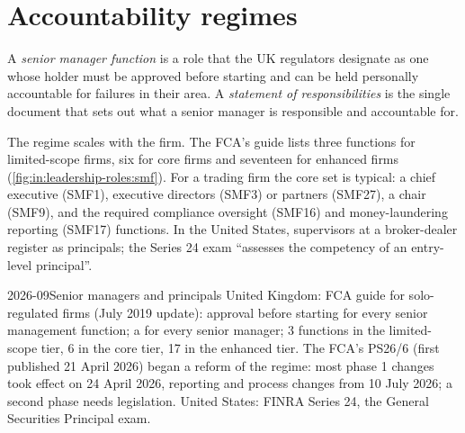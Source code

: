 \section{Accountability regimes}

\begin{definition}\label{def:in:leadership-roles:smf}
A \emph{senior manager function} is a role that the UK regulators designate as one whose
holder must be approved before starting and can be held personally accountable for failures in their area. A
\emph{statement of responsibilities} is the single document that sets out what a
senior manager is responsible and accountable for.
\end{definition}

The regime scales with the firm. The FCA's guide lists three functions for limited-scope firms, six for core firms and
seventeen for enhanced firms (\cref{fig:in:leadership-roles:smf}). For a trading firm the core set is typical: a chief
executive (SMF1), executive directors (SMF3) or partners (SMF27), a chair (SMF9), and the required compliance oversight
(SMF16) and money-laundering reporting (SMF17) functions. In the United States, supervisors at a broker-dealer register as
principals; the Series 24 exam ``assesses the competency of an entry-level principal''.

\begin{dated}{2026-09}{Senior managers and principals}\label{dat:in:leadership-roles:smcr}
United Kingdom: FCA guide for solo-regulated firms (July 2019 update): approval before starting for every senior
management function; a  for every senior manager; 3 functions in the limited-scope tier, 6
in the core tier, 17 in the enhanced tier. The FCA's PS26/6 (first published 21 April 2026) began a reform of the regime:
most phase 1 changes took effect on 24 April 2026, reporting and process changes from 10 July 2026; a second phase needs
legislation. United States: FINRA Series 24, the General Securities Principal exam.
\end{dated}

